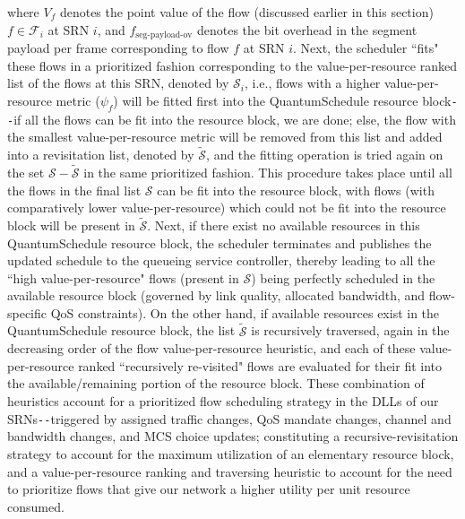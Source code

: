 where $V_{f}$ denotes the point value of the flow (discussed earlier in this section) $f{\in}\mathcal{F}_{i}$ at SRN $i$, and $f_{\text{seg-payload-ov}}$ denotes the bit overhead in the segment payload per frame corresponding to flow $f$ at SRN $i$. Next, the scheduler ``fits" these flows in a prioritized fashion corresponding to the value-per-resource ranked list of the flows at this SRN, denoted by $\mathcal{S}_{i}$, i.e., flows with a higher value-per-resource metric ($\psi_{f}$) will be fitted first into the QuantumSchedule resource block\texttt{-{}-}if all the flows can be fit into the resource block, we are done; else, the flow with the smallest value-per-resource metric will be removed from this list and added into a revisitation list, denoted by $\tilde{\mathcal{S}}$, and the fitting operation is tried again on the set $\mathcal{S}{-}\tilde{\mathcal{S}}$ in the same prioritized fashion. This procedure takes place until all the flows in the final list $\mathcal{S}$ can be fit into the resource block, with flows (with comparatively lower value-per-resource) which could not be fit into the resource block will be present in $\tilde{\mathcal{S}}$. Next, if there exist no available resources in this QuantumSchedule resource block, the scheduler terminates and publishes the updated schedule to the queueing service controller, thereby leading to all the ``high value-per-resource" flows (present in $\mathcal{S}$) being perfectly scheduled in the available resource block (governed by link quality, allocated bandwidth, and flow-specific QoS constraints). On the other hand, if available resources exist in the QuantumSchedule resource block, the list $\tilde{\mathcal{S}}$ is recursively traversed, again in the decreasing order of the flow value-per-resource heuristic, and each of these value-per-resource ranked ``recursively re-visited" flows are evaluated for their fit into the available/remaining portion of the resource block. These combination of heuristics account for a prioritized flow scheduling strategy in the DLLs of our SRNs\texttt{-{}-}triggered by assigned traffic changes, QoS mandate changes, channel and bandwidth changes, and MCS choice updates; constituting a recursive-revisitation strategy to account for the maximum utilization of an elementary resource block, and a value-per-resource ranking and traversing heuristic to account for the need to prioritize flows that give our network a higher utility per unit resource consumed.

